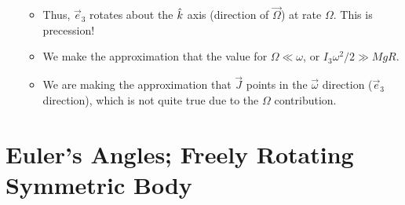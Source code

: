 \documentclass[../notes.tex]{subfiles}
\begin{document}
\begin{itemize}
\begin{itemize}
\begin{equation*}
        \end{equation*}
        \item Thus, $\vec{e}_3$ rotates about the $\hat{k}$ axis (direction of $\vec{\Omega}$) at rate $\Omega$. This is precession!
        \item We make the approximation that the value for $\Omega\ll\omega$, or $I_3\omega^2/2\gg MgR$.
        \item We are making the approximation that $\vec{J}$ points in the $\vec{\omega}$ direction ($\vec{e}_3$ direction), which is not quite true due to the $\Omega$ contribution.
    \end{itemize}
\end{itemize}



\section{Euler's Angles; Freely Rotating Symmetric Body}
\end{document}
